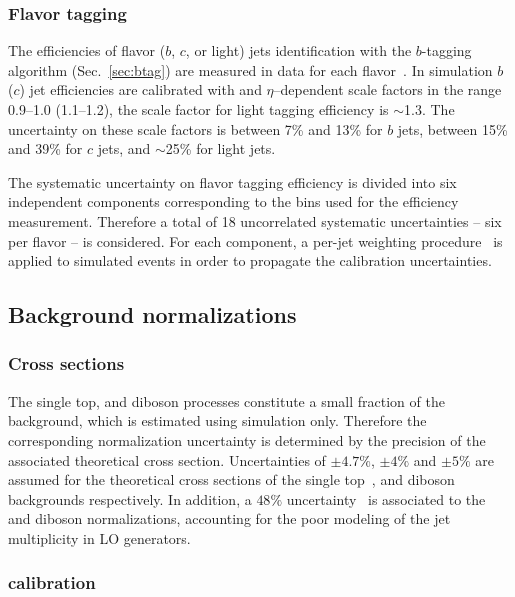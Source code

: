\subsubsection{Flavor tagging}
\label{sec:syst_btag}

The efficiencies of flavor ($b$, $c$, or light) jets identification with
the $b$-tagging algorithm (Sec.~\ref{sec:btag}) are measured in data
for each flavor~\cite{btagging,ctagging,ltagging}.
In simulation $b$ ($c$) jet efficiencies are calibrated with
\pt{} and $\eta$--dependent scale factors in the range 0.9--1.0 (1.1--1.2), the
scale factor for light tagging efficiency is $\sim$1.3.
The uncertainty on these scale factors is  between 7\% and 13\% for
$b$ jets, between 15\% and 39\% for $c$ jets, and $\sim$25\% for light jets.

The systematic uncertainty on flavor tagging efficiency is divided
into six independent components corresponding to the \pt{} bins used for
the efficiency measurement. Therefore a total of 18 uncorrelated
systematic uncertainties -- six per flavor -- is considered.
For each component, a per-jet weighting procedure~\cite{IFAEBtagNote}
is applied to simulated events in order to propagate the calibration
uncertainties.

\subsection{Background normalizations}

\subsubsection{Cross sections}
\label{sec:syst_bkgxsect}

 The single top, \zjets{} and diboson processes constitute a small
fraction of the background, which is estimated using simulation only.
Therefore the corresponding normalization uncertainty is determined by
the precision of the associated theoretical cross section.
Uncertainties of $\pm4.7\%$, $\pm4\%$ and $\pm 5\%$ are assumed
for the theoretical cross sections of the single
top~\cite{stschan,sttchan,stwt}, \zjets{} and diboson~\cite{dibosonxs}
backgrounds respectively.
In addition, a $48\%$ uncertainty~\cite{berends} is associated to the
\zjets{} and diboson normalizations, accounting for the poor modeling
of the jet multiplicity in LO generators.

\subsubsection{\wjets{} calibration}
\label{sec:syst_wjets}

